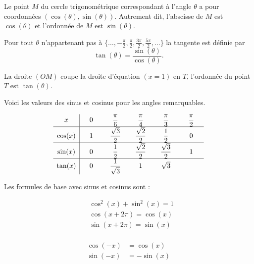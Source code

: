 \documentclass[11pt,class=report,crop=false]{standalone}
\begin{document}
Le point $M$ du cercle trigonométrique correspondant à l'angle $\theta$ a pour coordonnées $(\cos(\theta),\sin(\theta))$.
Autrement dit, l'abscisse de $M$ est $\cos(\theta)$ et l'ordonnée de $M$ est $\sin(\theta)$.



Pour tout $\theta$ n'appartenant pas à $\{\ldots, -\frac\pi2, \frac\pi2, \frac{3\pi}{2}, \frac{5\pi}{2},\ldots  \}$
la tangente est définie par
$$\tan(\theta) = \frac{\sin(\theta)}{\cos(\theta)}.$$

La droite $(OM)$ coupe la droite d'équation $(x=1)$ en $T$,
l'ordonnée du point $T$ est $\tan(\theta)$.

Voici les valeurs des sinus et cosinus pour les angles remarquables.

\begin{center}
\begin{minipage}{0.4\textwidth}
{
\renewcommand{\arraystretch}{2.5}
$$
\begin{array}{c|*{5}{c}}
	x     & \hphantom{X} 0 \hphantom{X} & \hphantom{X} \dfrac\pi6 \hphantom{X} &  \hphantom{X} \dfrac\pi 4 \hphantom{X}
	& \hphantom{X} \dfrac \pi 3 \hphantom{X} & \hphantom{X} \dfrac \pi 2 \hphantom{X} \\
	\hline
	\cos(x)   & 1 & \dfrac{\sqrt3}{2} & \dfrac{\sqrt2}{2} & \dfrac12 & 0 \\
	\hline
	\sin(x)   & 0 &\dfrac12 & \dfrac{\sqrt2}{2} & \dfrac{\sqrt3}{2} & 1\\
	\hline
	\tan(x)   & 0 & \dfrac{1}{\sqrt{3}} & 1 & \sqrt{3} &
\end{array}
$$
}
\end{minipage}\qquad\qquad\qquad
\begin{minipage}{0.4\textwidth}
\end{minipage}
\end{center}


Les formules de base avec sinus et cosinus sont :
\begin{center}
\begin{minipage}{0.4\textwidth}
\begin{align*}
	& \cos^2(x) + \sin^2(x) = 1 \\
	& \cos(x+2\pi)=\cos(x) \\
	& \sin(x+2\pi)=\sin(x) \\
\end{align*}
\end{minipage}\qquad
\begin{minipage}{0.4\textwidth}
\begin{align*}
	\cos (-x) &= \cos(x) \\
	\sin (-x) &= -\sin(x) \\
\end{align*}
\end{minipage}
\end{center}
\end{document}

